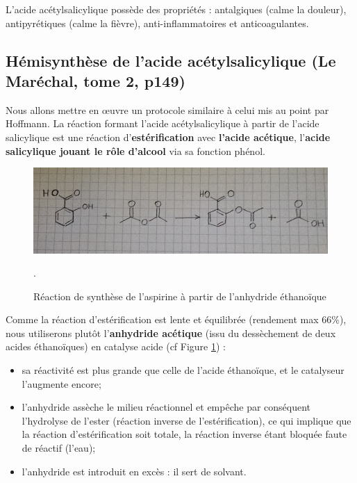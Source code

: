 \documentclass[11pt,a4paper]{report}
\begin{document}
L'acide acétylsalicylique possède des propriétés : antalgiques (calme la douleur), antipyrétiques (calme la fièvre), anti-inflammatoires et anticoagulantes.

\subsection{Hémisynthèse de l'acide acétylsalicylique (Le Maréchal, tome 2, p149)}

Nous allons mettre en œuvre un protocole similaire à celui mis au point par Hoffmann. La réaction formant l'acide acétylsalicylique à partir de l'acide salicylique est une réaction d'\textbf{estérification} avec \textbf{l'acide acétique}, l'\textbf{acide salicylique jouant le rôle d'alcool} via sa fonction phénol.
\begin{figure}[h!]
\begin{center}
	\includegraphics[scale = 0.3]{acetylation_acidesalicylique.png}
	\caption{Réaction de synthèse de l'aspirine à partir de l'anhydride éthanoïque}. 
	\label{fig:acetylation}
\end{center}
\end{figure}
Comme la réaction d'estérification est lente et équilibrée (rendement max 66\%), nous
utiliserons plutôt l'\textbf{anhydride acétique} (issu du dessèchement de deux acides éthanoïques) en catalyse acide (cf Figure \ref{fig:acetylation}) :
\begin{itemize}
	\item sa réactivité est plus grande que celle de l'acide éthanoïque, 
	et le catalyseur l'augmente encore;
	\item l'anhydride assèche le milieu réactionnel et empêche par conséquent l'hydrolyse de l'ester (réaction inverse de l'estérification), ce qui implique que la réaction d'estérification soit totale, la réaction inverse étant bloquée faute de réactif (l'eau);
	\item l'anhydride est introduit en excès : il sert de solvant.
\end{itemize}
\end{document}

